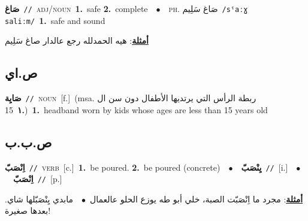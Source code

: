 \documentclass[10pt,a4paper,twoside]{article} %
\begin{document}
\begin{multicols}{2}
{{\setlength\topsep{0pt}\textbf{\foreignlanguage{arabic}{صَاغ}}\ {\color{gray}\texttt{//}\color{black}}\ \textsc{adj/noun}\ \textbf{1.}~safe  \textbf{2.}~complete\ \ $\bullet$\ \ \textsc{ph.} \color{gray} \foreignlanguage{arabic}{صَاغ سَلِيم}\color{black}\ {\color{gray}\texttt{/{\sffamily sˤaːɣ saliːm}/}\color{black}}\ \textbf{1.}~safe and sound\  \begin{flushright}\color{gray}\foreignlanguage{arabic}{\textbf{\underline{\foreignlanguage{arabic}{أمثلة}}}: هيه الحمدلله رجع عالدار صاغ سَلِيم}\end{flushright}\color{black}} \vspace{2mm}

\vspace{-3mm}
\subsection*{\color{blue}\foreignlanguage{arabic}{ص.اي}\color{blue}{ (ntws)}} 

{\setlength\topsep{0pt}\textbf{\foreignlanguage{arabic}{صَايِة}}\ {\color{gray}\texttt{//}\color{black}}\ \textsc{noun}\ [f.]\ \color{gray}(msa. \foreignlanguage{arabic}{ربطة الرأس التي يرتديها الأطفال دون سن ال 15}~\foreignlanguage{arabic}{\textbf{١.}})\color{black}\ \textbf{1.}~headband worn by kids whose ages are less than 15 years old\ 

\vspace{-3mm}
\subsection*{\color{blue}\foreignlanguage{arabic}{ص.ب.ب}\color{blue}{}} 

{\setlength\topsep{0pt}\textbf{\foreignlanguage{arabic}{اِنْصَبّ}}\ {\color{gray}\texttt{//}\color{black}}\ \textsc{verb}\ [c.]\ \textbf{1.}~be poured.  \textbf{2.}~be poured (concrete)\ \ $\bullet$\ \ \setlength\topsep{0pt}\textbf{\foreignlanguage{arabic}{يِنْصَبّ}}\ {\color{gray}\texttt{//}\color{black}}\ [i.]\ \ $\bullet$\ \ \setlength\topsep{0pt}\textbf{\foreignlanguage{arabic}{اِنْصَبّ}}\ {\color{gray}\texttt{//}\color{black}}\ [p.]\  \begin{flushright}\color{gray}\foreignlanguage{arabic}{\textbf{\underline{\foreignlanguage{arabic}{أمثلة}}}: مجرد ما اِنْصَبّت الصبة، خلي أبو طه يوزع الحلو عالعمال\ $\bullet$\ \  مابدي يِنْصَبّلها شاي. بعدها صغيرة!}\end{flushright}\color{black}} \vspace{2mm}

}}
\end{multicols}
\end{document}
